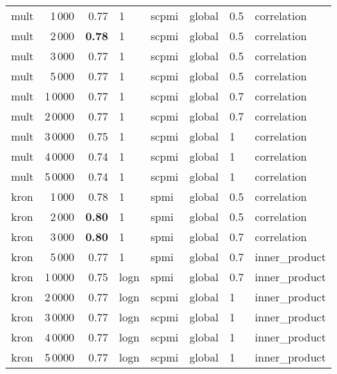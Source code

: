 \begin{tabular}{lrrlllll}
    mult &            1\,000 &  0.77 &     1 &  scpmi &  global &  0.5 &    correlation \\
    mult &            2\,000 &  \textbf{0.78} &     1 &  scpmi &  global &  0.5 &    correlation \\
    mult &            3\,000 &  0.77 &     1 &  scpmi &  global &  0.5 &    correlation \\
    mult &            5\,000 &  0.77 &     1 &  scpmi &  global &  0.5 &    correlation \\
    mult &           1\,0000 &  0.77 &     1 &  scpmi &  global &  0.7 &    correlation \\
    mult &           2\,0000 &  0.77 &     1 &  scpmi &  global &  0.7 &    correlation \\
    mult &           3\,0000 &  0.75 &     1 &  scpmi &  global &    1 &    correlation \\
    mult &           4\,0000 &  0.74 &     1 &  scpmi &  global &    1 &    correlation \\
    mult &           5\,0000 &  0.74 &     1 &  scpmi &  global &    1 &    correlation \\ \addlinespace
    kron &            1\,000 &  0.78 &     1 &   spmi &  global &  0.5 &    correlation \\
    kron &            2\,000 &  \textbf{0.80} &     1 &   spmi &  global &  0.5 &    correlation \\
    kron &            3\,000 &  \textbf{0.80} &     1 &   spmi &  global &  0.7 &    correlation \\
    kron &            5\,000 &  0.77 &     1 &   spmi &  global &  0.7 &  inner\_product \\
    kron &           1\,0000 &  0.75 &  logn &   spmi &  global &  0.7 &  inner\_product \\
    kron &           2\,0000 &  0.77 &  logn &  scpmi &  global &    1 &  inner\_product \\
    kron &           3\,0000 &  0.77 &  logn &  scpmi &  global &    1 &  inner\_product \\
    kron &           4\,0000 &  0.77 &  logn &  scpmi &  global &    1 &  inner\_product \\
    kron &           5\,0000 &  0.77 &  logn &  scpmi &  global &    1 &  inner\_product \\
\bottomrule
\end{tabular}
